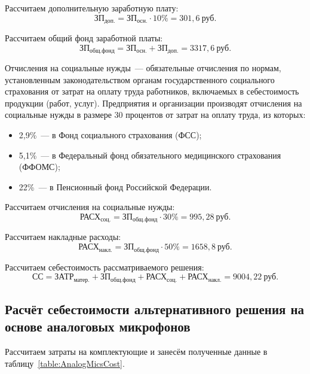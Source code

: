 Рассчитаем дополнительную заработную плату:
\begin{equation}
	\text{ЗП}_\text{доп.} = \text{ЗП}_\text{осн.} \cdot{} 10\% = 301,6~\text{руб}.
\end{equation}

Рассчитаем общий фонд заработной платы:
\begin{equation}
	\text{ЗП}_\text{общ.фонд} = \text{ЗП}_\text{осн.} + \text{ЗП}_\text{доп.} = 3317,6~\text{руб}.
\end{equation}

Отчисления на социальные нужды~--- обязательные отчисления по нормам, установленным законодательством органам государственного социального страхования от затрат на оплату труда работников, включаемых в себестоимость продукции (работ, услуг). Предприятия и организации производят отчисления на социальные нужды в размере 30 процентов от затрат на оплату труда, из которых:
\begin{itemize}
	\item 2,9\%~--- в Фонд социального страхования (ФСС);
	\item 5,1\%~--- в Федеральный фонд обязательного медицинского страхования (ФФОМС);
	\item 22\%~--- в Пенсионный фонд Российской Федерации.
\end{itemize}

Рассчитаем отчисления на социальные нужды:
\begin{equation}
	\text{РАСХ}_\text{соц.} = \text{ЗП}_\text{общ.фонд} \cdot{} 30\% = 995,28~\text{руб}.
\end{equation}

Рассчитаем накладные расходы:
\begin{equation}
	\text{РАСХ}_\text{накл.} = \text{ЗП}_\text{общ.фонд} \cdot{} 50\% = 1658,8~\text{руб}.
\end{equation}

Рассчитаем себестоимость рассматриваемого решения:
\begin{equation}
	\text{СС} = \text{ЗАТР}_\text{матер.} + \text{ЗП}_\text{общ.фонд} + \text{РАСХ}_\text{соц.} + \text{РАСХ}_\text{накл.} = 9004,22~\text{руб}.
\end{equation}

\subsection{Расчёт себестоимости альтернативного решения на основе аналоговых микрофонов}
Рассчитаем затраты на комплектующие и занесём полученные данные в таблицу~\ref{table:AnalogMicsCost}.

